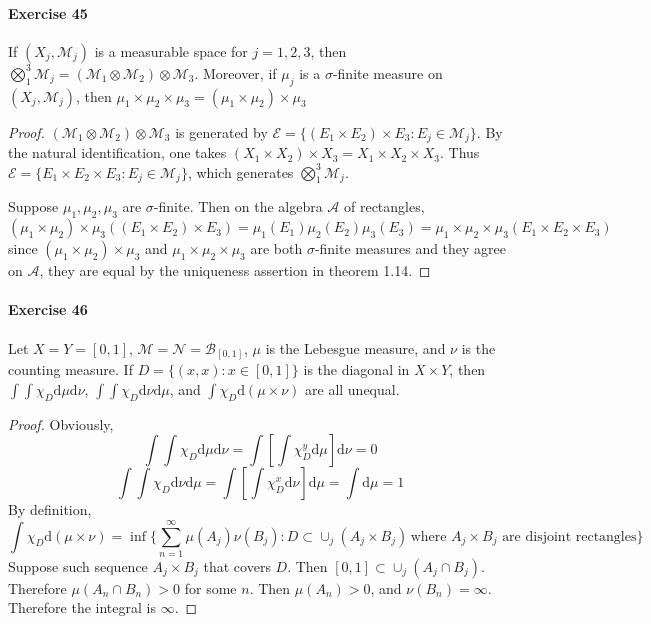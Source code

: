 \paragraph{Exercise 45}
If $(X_j,\mathcal{M}_j)$ is a measurable space for $j=1,2,3$, then $\bigotimes^3_1\mathcal{M}_j=(\mathcal{M}_1\otimes\mathcal{M}_2)\otimes\mathcal{M}_3$. Moreover, if $\mu_j$ is a $\sigma$-finite measure on $(X_j,\mathcal{M}_j)$, then $\mu_1\times\mu_2\times\mu_3=(\mu_1\times\mu_2)\times\mu_3$
\begin{proof}
    $(\mathcal{M}_1\otimes\mathcal{M}_2)\otimes\mathcal{M}_3$ is generated by $\mathcal{E}=\{(E_1\times E_2)\times E_3:E_j\in\mathcal{M}_j\}$. By the natural identification, one takes $(X_1\times X_2)\times X_3=X_1\times X_2\times X_3$. Thus
    $\mathcal{E}=\{E_1\times E_2\times E_3:E_j\in\mathcal{M}_j\}$, which generates $\bigotimes^3_1\mathcal{M}_j$.
    \par Suppose $\mu_1,\mu_2,\mu_3$ are $\sigma$-finite. Then on the algebra $\mathcal{A}$ of rectangles,
    $$
    (\mu_1\times\mu_2)\times\mu_3((E_1\times E_2)\times E_3)=\mu_1(E_1)\mu_2(E_2)\mu_3(E_3)=\mu_1\times\mu_2\times\mu_3(E_1\times E_2\times E_3)
    $$
    since $(\mu_1\times\mu_2)\times\mu_3$ and $\mu_1\times\mu_2\times\mu_3$ are both $\sigma$-finite measures and they agree on $\mathcal{A}$, they are equal by the uniqueness assertion in theorem 1.14.
\end{proof}
\paragraph{Exercise 46}
Let $X=Y=[0,1]$, $\mathcal{M}=\mathcal{N}=\mathcal{B}_{[0,1]}$, $\mu$ is the Lebesgue measure, and $\nu$ is the counting measure. If $D=\{(x,x):x\in[0,1]\}$ is the diagonal in $X\times Y$, then $\int\int\chi_D\mathrm{d}\mu\mathrm{d}\nu$, $\int\int\chi_D\mathrm{d}\nu\mathrm{d}\mu$, and $\int\chi_D\mathrm{d}(\mu\times\nu)$ are all unequal.
\begin{proof}
    Obviously,
    $$
    \int\int\chi_D\mathrm{d}\mu\mathrm{d}\nu=\int\left[\int\chi_D^y\mathrm{d}\mu\right]\mathrm{d}\nu=0
    $$
    $$
    \int\int\chi_D\mathrm{d}\nu\mathrm{d}\mu=\int\left[\int\chi_D^x\mathrm{d}\nu\right]\mathrm{d}\mu=\int\mathrm{d}\mu=1
    $$
    By definition,
    $$
    \int\chi_D\mathrm{d}(\mu\times\nu)=\inf\{\sum_{n=1}^\infty\mu(A_j)\nu(B_j):D\subset\cup_j(A_j\times B_j)\,\text{where $A_j\times B_j$ are disjoint rectangles}\}
    $$
    Suppose such sequence $A_j\times B_j$ that covers $D$. Then $[0,1]\subset\cup_j(A_j\cap B_j)$. Therefore $\mu(A_n\cap B_n)>0$ for some $n$. Then $\mu(A_n)>0$, and $\nu(B_n)=\infty$. Therefore the integral is $\infty$.
\end{proof}
